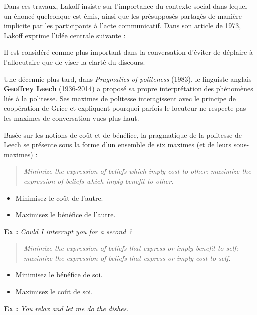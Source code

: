 Dans ces travaux, Lakoff insiste sur l’importance du contexte social dans lequel un énoncé quelconque est émis, ainsi que les présupposés partagés de manière implicite par les participants à l’acte communicatif. Dans son article de 1973, Lakoff exprime l’idée centrale suivante :
\begin{lecture}{}
Il est considéré comme plus important dans la conversation d’éviter de déplaire à l’allocutaire que de viser la clarté du discours.
\end{lecture}
Une décennie plus tard, dans \textit{Pragmatics of politeness} (1983), le linguiste anglais \textbf{Geoffrey Leech} (1936-2014) a proposé sa propre interprétation des phénomènes liés à la politesse. Ses maximes de politesse interagissent avec le principe de coopération de Grice et expliquent pourquoi parfois le locuteur ne respecte pas les maximes de conversation vues plus haut.

Basée sur les notions de coût et de bénéfice, la pragmatique de la politesse de Leech se présente sous la forme d’un ensemble de six maximes (et de leurs sous-maximes) :

\begin{quote}\itshape
Minimize the expression of beliefs which imply cost to other; maximize the expression of beliefs which imply benefit to other.
\end{quote}
\begin{itemize}
\item Minimisez le coût de l’autre.
\item Maximisez le bénéfice de l’autre.
\end{itemize}
\textbf{Ex :} \textit{Could I interrupt you for a second ?}

\begin{quote}\itshape
Minimize the expression of beliefs that express or imply benefit to self; maximize the expression of beliefs that express or imply cost to self.
\end{quote}
\begin{itemize}
\item Minimisez le bénéfice de soi.
\item Maximisez le coût de soi.
\end{itemize}
\textbf{Ex :} \textit{You relax and let me do the dishes.}

